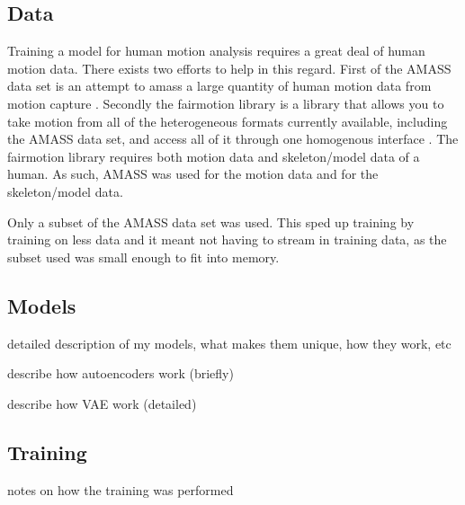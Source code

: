 \subsection{Data}\label{subsec:data}
Training a model for human motion analysis requires a great deal of human motion data. There exists two efforts to help in this regard. First of the AMASS data set is an attempt to amass a large quantity of human motion data from motion capture \cite{AMASS:2019}. Secondly the fairmotion library is a library that allows you to take motion from all of the heterogeneous formats currently available, including the AMASS data set, and access all of it through one homogenous interface \cite{gopinath2020fairmotion}. The fairmotion library requires both motion data and skeleton/model data of a human. As such, AMASS was used for the motion data and \cite{MANO:2017} for the skeleton/model data.

Only a subset of the AMASS data set was used. This sped up training by training on less data and it meant not having to stream in training data, as the subset used was small enough to fit into memory.

\subsection{Models}\label{subsec:models}
detailed description of my models, what makes them unique, how they work, etc

describe how autoencoders work (briefly)

describe how VAE work (detailed)

\subsection{Training}\label{subsec:training}
notes on how the training was performed